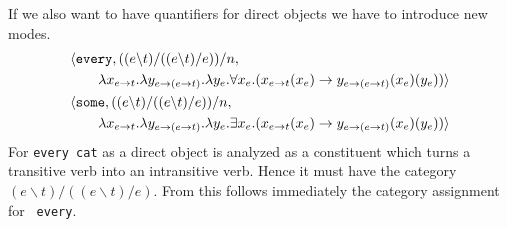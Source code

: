 If we also want to have quantifiers for direct objects we have
to introduce new modes.
\begin{align}
\begin{split}
& \langle \mbox{\tt every}, ((e \backslash t)/((e \backslash t)/e))/n, \\
& \qquad \lambda x_{e \rightarrow t}. \lambda y_{e \rightarrow (e \rightarrow t)}.
    \lambda y_e. \forall x_e. (x_{e \rightarrow t}(x_e) \rightarrow
    y_{e \rightarrow (e \rightarrow t)}(x_e)(y_e))\rangle \\
\end{split} \\
\begin{split}
& \langle \mbox{\tt some}, ((e \backslash t)/((e \backslash t)/e))/n, \\
& \qquad \lambda x_{e \rightarrow t}. \lambda y_{e \rightarrow (e \rightarrow t)}.
\lambda y_e. \exists x_e. (x_{e \rightarrow t}(x_e) \rightarrow
    y_{e \rightarrow (e \rightarrow t)}(x_e)(y_e))\rangle
\end{split}
\end{align}
For {\tt every cat} as a direct object is analyzed as a constituent
which turns a transitive verb into an intransitive verb. Hence it
must have the category $(e \backslash t)/((e \backslash t)/e)$.
From this follows immediately the category assignment for {\tt
every}.


